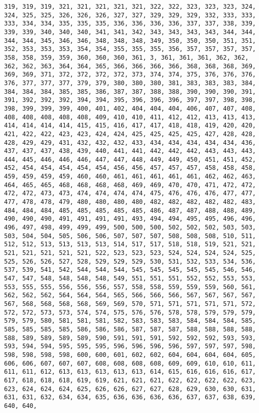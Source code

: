 \documentclass[11pt]{article}
\begin{document}
\begin{Verbatim}[commandchars=\\\{\}]
319, 319, 319, 321, 321, 321, 321, 321, 322, 322, 323, 323, 323, 324, 324, 325, 325, 326, 326, 326, 327, 327, 329, 329, 329, 332, 333, 333, 333, 334, 334, 335, 335, 335, 336, 336, 336, 336, 337, 337, 338, 339, 339, 339, 340, 340, 340, 341, 341, 342, 343, 343, 343, 343, 344, 344, 344, 344, 345, 346, 346, 348, 348, 348, 349, 350, 350, 350, 351, 351, 352, 353, 353, 353, 354, 354, 355, 355, 355, 356, 357, 357, 357, 357, 358, 358, 359, 359, 360, 360, 360, 361, 3, 361, 361, 361, 362, 362, 362, 362, 363, 364, 364, 365, 366, 366, 366, 366, 368, 368, 368, 369, 369, 369, 371, 372, 372, 372, 372, 373, 374, 374, 375, 376, 376, 376, 376, 377, 377, 377, 379, 379, 380, 380, 380, 381, 383, 383, 383, 384, 384, 384, 384, 385, 385, 386, 387, 387, 388, 388, 390, 390, 390, 391, 391, 392, 392, 392, 394, 394, 395, 396, 396, 396, 397, 397, 398, 398, 398, 399, 399, 399, 400, 401, 402, 404, 404, 404, 406, 407, 407, 408, 408, 408, 408, 408, 408, 409, 410, 410, 411, 412, 412, 413, 413, 413, 414, 414, 414, 414, 415, 415, 416, 417, 417, 418, 418, 419, 420, 420, 421, 422, 422, 423, 423, 424, 424, 425, 425, 425, 425, 427, 428, 428, 428, 429, 429, 431, 432, 432, 432, 433, 434, 434, 434, 434, 434, 436, 437, 437, 437, 438, 439, 440, 441, 441, 442, 442, 442, 443, 443, 443, 444, 445, 446, 446, 446, 447, 447, 448, 449, 449, 450, 451, 451, 452, 452, 454, 454, 454, 454, 454, 456, 456, 457, 457, 457, 458, 458, 458, 459, 459, 459, 459, 460, 460, 461, 461, 461, 461, 461, 462, 462, 463, 464, 465, 465, 468, 468, 468, 468, 469, 469, 470, 470, 471, 472, 472, 472, 472, 473, 473, 474, 474, 474, 474, 475, 476, 476, 476, 477, 477, 477, 478, 478, 479, 480, 480, 480, 480, 482, 482, 482, 482, 482, 483, 484, 484, 484, 485, 485, 485, 485, 485, 486, 487, 487, 488, 488, 489, 490, 490, 490, 491, 491, 491, 491, 493, 494, 494, 495, 495, 496, 496, 496, 497, 498, 499, 499, 499, 500, 500, 500, 502, 502, 502, 503, 503, 503, 504, 504, 505, 506, 506, 507, 507, 507, 508, 508, 508, 510, 511, 512, 512, 513, 513, 513, 513, 514, 517, 517, 518, 518, 519, 521, 521, 521, 521, 521, 521, 521, 522, 523, 523, 523, 524, 524, 524, 524, 525, 525, 526, 526, 527, 528, 529, 529, 529, 530, 531, 532, 533, 534, 536, 537, 539, 541, 542, 544, 544, 544, 545, 545, 545, 545, 545, 546, 546, 547, 547, 548, 548, 548, 548, 549, 551, 551, 551, 552, 552, 553, 553, 553, 555, 555, 556, 556, 556, 557, 558, 558, 559, 559, 559, 560, 561, 562, 562, 562, 564, 564, 564, 565, 566, 566, 566, 567, 567, 567, 567, 567, 568, 568, 568, 568, 569, 569, 570, 571, 571, 571, 571, 571, 572, 572, 572, 573, 573, 574, 574, 575, 576, 576, 578, 578, 579, 579, 579, 579, 579, 580, 581, 581, 581, 582, 583, 583, 583, 584, 584, 584, 585, 585, 585, 585, 585, 586, 586, 586, 587, 587, 587, 588, 588, 588, 588, 588, 589, 589, 589, 589, 590, 591, 591, 591, 592, 592, 592, 593, 593, 593, 594, 594, 595, 595, 595, 596, 596, 596, 596, 597, 597, 597, 598, 598, 598, 598, 598, 600, 600, 601, 602, 602, 604, 604, 604, 604, 605, 606, 606, 607, 607, 607, 608, 608, 608, 608, 609, 609, 610, 610, 611, 611, 611, 612, 613, 613, 613, 613, 613, 614, 615, 616, 616, 616, 617, 617, 618, 618, 618, 619, 619, 621, 621, 621, 622, 622, 622, 622, 623, 623, 624, 624, 624, 625, 626, 626, 627, 627, 628, 629, 630, 630, 631, 631, 631, 632, 634, 634, 635, 636, 636, 636, 636, 637, 637, 638, 639, 640, 640, 
\end{Verbatim}
\end{document}
